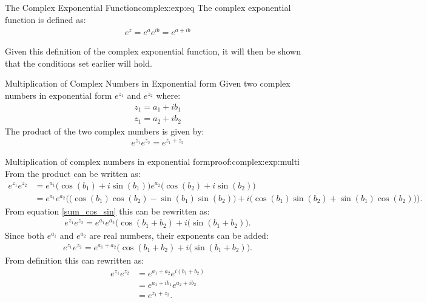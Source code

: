 \begin{definition}{The Complex Exponential Function}{complex:exp:eq}
The complex exponential function is defined as:
\begin{align*}
	e^{z}=e^{a}e^{ib}=e^{a+ib}
\end{align*}
\end{definition}

\noindent
Given this definition of the complex exponential function, it will then be shown that the conditions set earlier will hold.


\begin{theorem}{Multiplication of Complex Numbers in Exponential form}{}
Given two complex numbers in exponential form $e^{z_1}$ and $e^{z_2}$ where:
\begin{align*}
z_1=a_1+ib_1
\\
z_1=a_2+ib_2
\end{align*}
The product of the two complex numbers is given by:
\begin{align*}
e^{z_1}e^{z_2}=e^{z_1+z_2}
\end{align*}
\end{theorem}


\begin{prof}{Multiplication of complex numbers in exponential form}{proof:complex:exp:multi}
From  the product can be written as:
\begin{align*}
e^{z_1}e^{z_2}&=e^{a_1}\big(\cos(b_1)+i\sin(b_1)\big)e^{a_2}\big(\cos(b_2)+i\sin(b_2)\big)
\\
&=e^{a_1}e^{a_2} \Big( \big(\cos(b_1)\cos(b_2)-\sin(b_1) \sin(b_2) \big)+i \big(\cos(b_1)\sin(b_2)+\sin(b_1)\cos(b_2) \big) \Big).
\end{align*}
From equation \eqref{sum_cos_sin} this can be rewritten as:
\begin{align*}
e^{z_1}e^{z_2}=e^{a_1}e^{a_2}\big(\cos(b_1+b_2)+i(\sin(b_1+b_2)\big).
\end{align*}
Since both $e^{a_1}$ and $e^{a_2}$ are real numbers, their exponents can be added:
\begin{align*}
e^{z_1}e^{z_2}=e^{a_1+a_2}\big(\cos(b_1+b_2)+i(\sin(b_1+b_2)\big).
\end{align*}
From definition 
this can rewritten as:
\begin{align*}
e^{z_1}e^{z_2}&=e^{a_1+a_2}e^{i(b_1+b_2)}
\\
&=e^{a_1+ib_1}e^{a_2+ib_2}
\\
&=e^{z_1+z_2}.
\end{align*} 
\end{prof}

